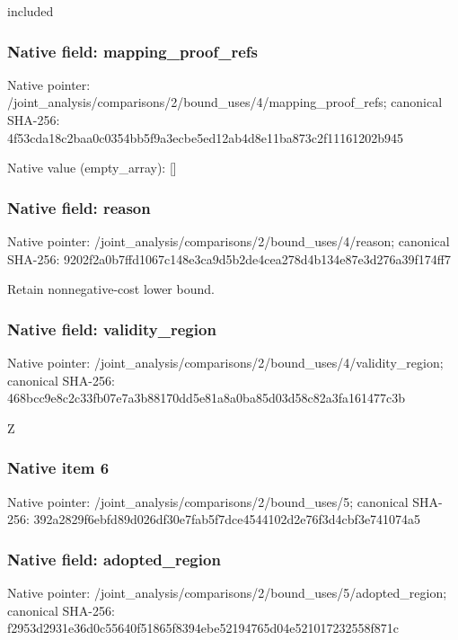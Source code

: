 \documentclass[10pt,a4paper]{article}
\begin{document}
\begingroup\raggedright\sloppy included\par\endgroup

\subsubsection{Native field: mapping\_\allowbreak{}proof\_\allowbreak{}refs}
Native pointer: /joint\_\allowbreak{}analysis/comparisons/2/bound\_\allowbreak{}uses/4/mapping\_\allowbreak{}proof\_\allowbreak{}refs; canonical SHA-256: 4f53cda18c2baa0c0354bb5f9a3ecbe5ed12ab4d8e11ba873c2f11161202b945

Native value (empty\_\allowbreak{}array): []

\subsubsection{Native field: reason}
Native pointer: /joint\_\allowbreak{}analysis/comparisons/2/bound\_\allowbreak{}uses/4/reason; canonical SHA-256: 9202f2a0b7ffd1067c148e3ca9d5b2de4cea278d4b134e87e3d276a39f174ff7

\begingroup\raggedright\sloppy Retain nonnegative-cost lower bound.\par\endgroup

\subsubsection{Native field: validity\_\allowbreak{}region}
Native pointer: /joint\_\allowbreak{}analysis/comparisons/2/bound\_\allowbreak{}uses/4/validity\_\allowbreak{}region; canonical SHA-256: 468bcc9e8c2c33fb07e7a3b88170dd5e81a8a0ba85d03d58c82a3fa161477c3b

\begingroup\raggedright\sloppy Z\par\endgroup

\subsubsection{Native item 6}
Native pointer: /joint\_\allowbreak{}analysis/comparisons/2/bound\_\allowbreak{}uses/5; canonical SHA-256: 392a2829f6ebfd89d026df30e7fab5f7dce4544102d2e76f3d4cbf3e741074a5

\subsubsection{Native field: adopted\_\allowbreak{}region}
Native pointer: /joint\_\allowbreak{}analysis/comparisons/2/bound\_\allowbreak{}uses/5/adopted\_\allowbreak{}region; canonical SHA-256: f2953d2931e36d0c55640f51865f8394ebe52194765d04e521017232558f871c
\end{document}

